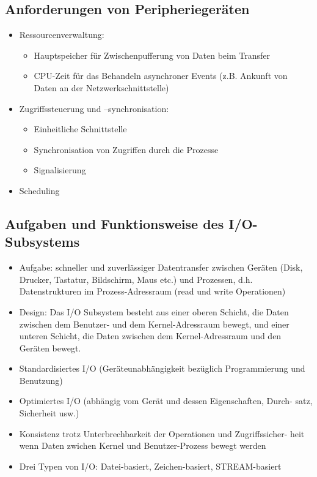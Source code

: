 \documentclass[a4paper, 10pt]{article}
\begin{document}
\subsection{Anforderungen von Peripheriegeräten}
\begin{itemize}
	\item Ressourcenverwaltung:
		\begin{itemize}
			\item Hauptspeicher für Zwischenpufferung von Daten beim Transfer
			\item CPU-Zeit für das Behandeln asynchroner Events (z.B. Ankunft von Daten an der Netzwerkschnittstelle)
		\end{itemize}
	\item Zugriffssteuerung und –synchronisation:
		\begin{itemize}
			\item Einheitliche Schnittstelle
			\item Synchronisation von Zugriffen durch die Prozesse
			\item Signalisierung
		\end{itemize}
	\item Scheduling
\end{itemize}

\subsection{Aufgaben und Funktionsweise des I/O-Subsystems}
\begin{itemize}
	\item Aufgabe: schneller und zuverlässiger Datentransfer zwischen Geräten (Disk, Drucker, Tastatur, Bildschirm, Maus etc.) und Prozessen, d.h. Datenstrukturen im Prozess-Adressraum (read und write Operationen)
	\item Design: Das I/O Subsystem besteht aus einer oberen Schicht, die Daten zwischen dem Benutzer- und dem Kernel-Adressraum bewegt, und einer unteren Schicht, die Daten zwischen dem Kernel-Adressraum und den Geräten bewegt.
	\item Standardisiertes I/O (Geräteunabhängigkeit bezüglich Programmierung und Benutzung)
	\item Optimiertes I/O (abhängig vom Gerät und dessen Eigenschaften, Durch- satz, Sicherheit usw.)
	\item Konsistenz trotz Unterbrechbarkeit der Operationen und Zugriffssicher- heit wenn Daten zwichen Kernel und Benutzer-Prozess bewegt werden
	\item Drei Typen von I/O: Datei-basiert, Zeichen-basiert, STREAM-basiert
\end{itemize}
\end{document}
